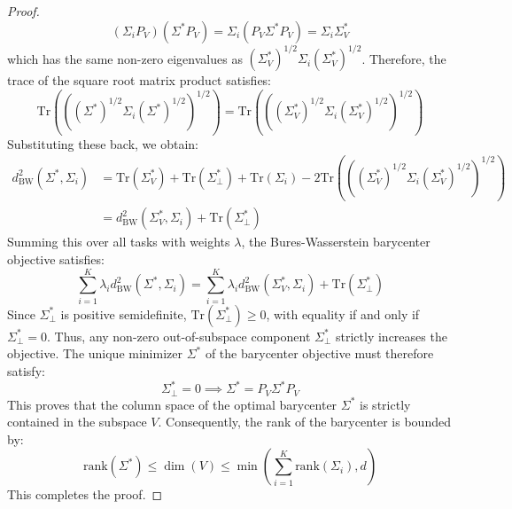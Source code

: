 \documentclass{article}
\theoremstyle{plain}
\theoremstyle{definition}
\theoremstyle{remark}
\begin{document}
\begin{proof}
\begin{equation}
  (\Sigma_i P_V) (\Sigma^* P_V) = \Sigma_i (P_V \Sigma^* P_V) = \Sigma_i \Sigma^*_V
\end{equation}
which has the same non-zero eigenvalues as $(\Sigma^*_V)^{1/2} \Sigma_i (\Sigma^*_V)^{1/2}$.
Therefore, the trace of the square root matrix product satisfies:
\begin{equation}
  \text{Tr}\left( \left( (\Sigma^*)^{1/2} \Sigma_i (\Sigma^*)^{1/2} \right)^{1/2} \right) = \text{Tr}\left( \left( (\Sigma^*_V)^{1/2} \Sigma_i (\Sigma^*_V)^{1/2} \right)^{1/2} \right)
\end{equation}
Substituting these back, we obtain:
\begin{align}
  d_{\text{BW}}^2(\Sigma^*, \Sigma_i) &= \text{Tr}(\Sigma^*_V) + \text{Tr}(\Sigma^*_{\perp}) + \text{Tr}(\Sigma_i) - 2 \text{Tr}\left( \left( (\Sigma^*_V)^{1/2} \Sigma_i (\Sigma^*_V)^{1/2} \right)^{1/2} \right) \\
  &= d_{\text{BW}}^2(\Sigma^*_V, \Sigma_i) + \text{Tr}(\Sigma^*_{\perp})
\end{align}
Summing this over all tasks with weights $\lambda$, the Bures-Wasserstein barycenter objective satisfies:
\begin{equation}
  \sum_{i=1}^K \lambda_i d_{\text{BW}}^2(\Sigma^*, \Sigma_i) = \sum_{i=1}^K \lambda_i d_{\text{BW}}^2(\Sigma^*_V, \Sigma_i) + \text{Tr}(\Sigma^*_{\perp})
\end{equation}
Since $\Sigma^*_{\perp}$ is positive semidefinite, $\text{Tr}(\Sigma^*_{\perp}) \ge 0$, with equality if and only if $\Sigma^*_{\perp} = 0$.
Thus, any non-zero out-of-subspace component $\Sigma^*_{\perp}$ strictly increases the objective.
The unique minimizer $\Sigma^*$ of the barycenter objective must therefore satisfy:
\begin{equation}
  \Sigma^*_{\perp} = 0 \implies \Sigma^* = P_V \Sigma^* P_V
\end{equation}
This proves that the column space of the optimal barycenter $\Sigma^*$ is strictly contained in the subspace $V$.
Consequently, the rank of the barycenter is bounded by:
\begin{equation}
  \text{rank}(\Sigma^*) \le \dim(V) \le \min \left( \sum_{i=1}^K \text{rank}(\Sigma_i), d \right)
\end{equation}
This completes the proof.
\end{proof}
\end{document}
